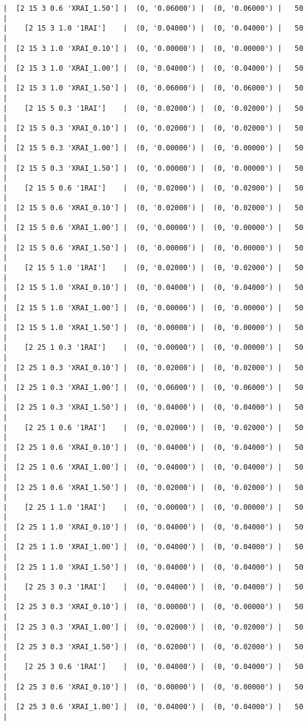 \documentclass{article}
\begin{document}
\begin{verbatim}
|  [2 15 3 0.6 'XRAI_1.50'] |  (0, '0.06000') |  (0, '0.06000') |   50  |
|    [2 15 3 1.0 '1RAI']    |  (0, '0.04000') |  (0, '0.04000') |   50  |
|  [2 15 3 1.0 'XRAI_0.10'] |  (0, '0.00000') |  (0, '0.00000') |   50  |
|  [2 15 3 1.0 'XRAI_1.00'] |  (0, '0.04000') |  (0, '0.04000') |   50  |
|  [2 15 3 1.0 'XRAI_1.50'] |  (0, '0.06000') |  (0, '0.06000') |   50  |
|    [2 15 5 0.3 '1RAI']    |  (0, '0.02000') |  (0, '0.02000') |   50  |
|  [2 15 5 0.3 'XRAI_0.10'] |  (0, '0.02000') |  (0, '0.02000') |   50  |
|  [2 15 5 0.3 'XRAI_1.00'] |  (0, '0.00000') |  (0, '0.00000') |   50  |
|  [2 15 5 0.3 'XRAI_1.50'] |  (0, '0.00000') |  (0, '0.00000') |   50  |
|    [2 15 5 0.6 '1RAI']    |  (0, '0.02000') |  (0, '0.02000') |   50  |
|  [2 15 5 0.6 'XRAI_0.10'] |  (0, '0.02000') |  (0, '0.02000') |   50  |
|  [2 15 5 0.6 'XRAI_1.00'] |  (0, '0.00000') |  (0, '0.00000') |   50  |
|  [2 15 5 0.6 'XRAI_1.50'] |  (0, '0.00000') |  (0, '0.00000') |   50  |
|    [2 15 5 1.0 '1RAI']    |  (0, '0.02000') |  (0, '0.02000') |   50  |
|  [2 15 5 1.0 'XRAI_0.10'] |  (0, '0.04000') |  (0, '0.04000') |   50  |
|  [2 15 5 1.0 'XRAI_1.00'] |  (0, '0.00000') |  (0, '0.00000') |   50  |
|  [2 15 5 1.0 'XRAI_1.50'] |  (0, '0.00000') |  (0, '0.00000') |   50  |
|    [2 25 1 0.3 '1RAI']    |  (0, '0.00000') |  (0, '0.00000') |   50  |
|  [2 25 1 0.3 'XRAI_0.10'] |  (0, '0.02000') |  (0, '0.02000') |   50  |
|  [2 25 1 0.3 'XRAI_1.00'] |  (0, '0.06000') |  (0, '0.06000') |   50  |
|  [2 25 1 0.3 'XRAI_1.50'] |  (0, '0.04000') |  (0, '0.04000') |   50  |
|    [2 25 1 0.6 '1RAI']    |  (0, '0.02000') |  (0, '0.02000') |   50  |
|  [2 25 1 0.6 'XRAI_0.10'] |  (0, '0.04000') |  (0, '0.04000') |   50  |
|  [2 25 1 0.6 'XRAI_1.00'] |  (0, '0.04000') |  (0, '0.04000') |   50  |
|  [2 25 1 0.6 'XRAI_1.50'] |  (0, '0.02000') |  (0, '0.02000') |   50  |
|    [2 25 1 1.0 '1RAI']    |  (0, '0.00000') |  (0, '0.00000') |   50  |
|  [2 25 1 1.0 'XRAI_0.10'] |  (0, '0.04000') |  (0, '0.04000') |   50  |
|  [2 25 1 1.0 'XRAI_1.00'] |  (0, '0.04000') |  (0, '0.04000') |   50  |
|  [2 25 1 1.0 'XRAI_1.50'] |  (0, '0.04000') |  (0, '0.04000') |   50  |
|    [2 25 3 0.3 '1RAI']    |  (0, '0.04000') |  (0, '0.04000') |   50  |
|  [2 25 3 0.3 'XRAI_0.10'] |  (0, '0.00000') |  (0, '0.00000') |   50  |
|  [2 25 3 0.3 'XRAI_1.00'] |  (0, '0.02000') |  (0, '0.02000') |   50  |
|  [2 25 3 0.3 'XRAI_1.50'] |  (0, '0.02000') |  (0, '0.02000') |   50  |
|    [2 25 3 0.6 '1RAI']    |  (0, '0.04000') |  (0, '0.04000') |   50  |
|  [2 25 3 0.6 'XRAI_0.10'] |  (0, '0.00000') |  (0, '0.00000') |   50  |
|  [2 25 3 0.6 'XRAI_1.00'] |  (0, '0.04000') |  (0, '0.04000') |   50  |

\end{verbatim}
\end{document}
